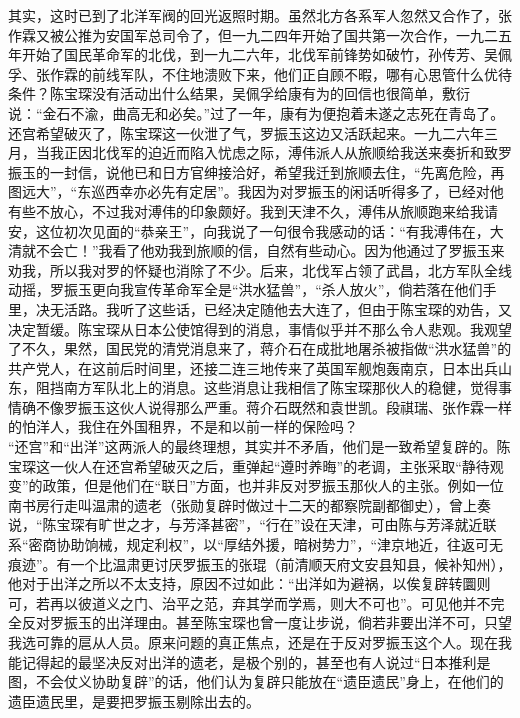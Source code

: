 其实，这时已到了北洋军阀的回光返照时期。虽然北方各系军人忽然又合作了，张作霖又被公推为安国军总司令了，但一九二四年开始了国共第一次合作，一九二五年开始了国民革命军的北伐，到一九二六年，北伐军前锋势如破竹，孙传芳、吴佩孚、张作霖的前线军队，不住地溃败下来，他们正自顾不暇，哪有心思管什么优待条件？陈宝琛没有活动出什么结果，吴佩孚给康有为的回信也很简单，敷衍说：“金石不渝，曲高无和必矣。”过了一年，康有为便抱着未遂之志死在青岛了。\\

还宫希望破灭了，陈宝琛这一伙泄了气，罗振玉这边又活跃起来。一九二六年三月，当我正因北伐军的迫近而陷入忧虑之际，溥伟派人从旅顺给我送来奏折和致罗振玉的一封信，说他已和日方官绅接洽好，希望我迁到旅顺去住，“先离危险，再图远大”，“东巡西幸亦必先有定居”。我因为对罗振玉的闲话听得多了，已经对他有些不放心，不过我对溥伟的印象颇好。我到天津不久，溥伟从旅顺跑来给我请安，这位初次见面的“恭亲王”，向我说了一句很令我感动的话：“有我溥伟在，大清就不会亡！”我看了他劝我到旅顺的信，自然有些动心。因为他通过了罗振玉来劝我，所以我对罗的怀疑也消除了不少。后来，北伐军占领了武昌，北方军队全线动摇，罗振玉更向我宣传革命军全是“洪水猛兽”，“杀人放火”，倘若落在他们手里，决无活路。我听了这些话，已经决定随他去大连了，但由于陈宝琛的劝告，又决定暂缓。陈宝琛从日本公使馆得到的消息，事情似乎并不那么令人悲观。我观望了不久，果然，国民党的清党消息来了，蒋介石在成批地屠杀被指做“洪水猛兽”的共产党人，在这前后时间里，还接二连三地传来了英国军舰炮轰南京，日本出兵山东，阻挡南方军队北上的消息。这些消息让我相信了陈宝琛那伙人的稳健，觉得事情确不像罗振玉这伙人说得那么严重。蒋介石既然和袁世凯。段祺瑞、张作霖一样的怕洋人，我住在外国租界，不是和以前一样的保险吗？\\

“还宫”和“出洋”这两派人的最终理想，其实并不矛盾，他们是一致希望复辟的。陈宝琛这一伙人在还宫希望破灭之后，重弹起“遵时养晦”的老调，主张采取“静待观变”的政策，但是他们在“联日”方面，也并非反对罗振玉那伙人的主张。例如一位南书房行走叫温肃的遗老（张勋复辟时做过十二天的都察院副都御史），曾上奏说，“陈宝琛有旷世之才，与芳泽甚密”，“行在”设在天津，可由陈与芳泽就近联系“密商协助饷械，规定利权”，以“厚结外援，暗树势力”，“津京地近，往返可无痕迹”。有一个比温肃更讨厌罗振玉的张琨（前清顺天府文安县知县，候补知州），他对于出洋之所以不太支持，原因不过如此：“出洋如为避祸，以俟复辟转圜则可，若再以彼道义之门、治平之范，弃其学而学焉，则大不可也”。可见他并不完全反对罗振玉的出洋理由。甚至陈宝琛也曾一度让步说，倘若非要出洋不可，只望我选可靠的扈从人员。原来问题的真正焦点，还是在于反对罗振玉这个人。现在我能记得起的最坚决反对出洋的遗老，是极个别的，甚至也有人说过“日本推利是图，不会仗义协助复辟”的话，他们认为复辟只能放在“遗臣遗民”身上，在他们的遗臣遗民里，是要把罗振玉剔除出去的。\\

